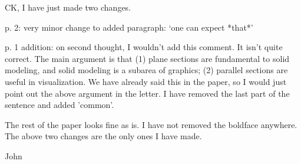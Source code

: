 CK, I have just made two changes.

p. 2: very minor change to added paragraph: `one can expect *that*'

p. 1 addition: on second thought, I wouldn't add this comment.
	It isn't quite correct.
	The main argument is that (1) plane sections are fundamental
	to solid modeling, and solid modeling is a subarea of graphics;
	(2) parallel sections are useful in visualization.
	We have already said this in the paper, so I would just
	point out the above argument in the letter.
	I have removed the last part of the sentence and added 'common'. 

The rest of the paper looks fine as is.
I have not removed the boldface anywhere.  The above two changes
are the only ones I have made.

John


